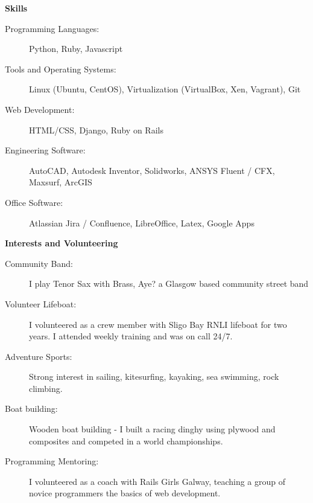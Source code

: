 \documentclass[letterpaper,11pt]{article}
\newcommand{\resheading}[1]{{\large \colorbox{mygrey}{\begin{minipage}{\textwidth}{\textbf{#1 \vphantom{p\^{E}}}}\end{minipage}}}}
\begin{document}
\resheading{Skills}
	\begin{description}
    \item[Programming Languages:] { \footnotesize Python, Ruby, Javascript}
    \item[Tools and Operating Systems:] { \footnotesize Linux (Ubuntu, CentOS), Virtualization (VirtualBox, Xen, Vagrant), Git
    }
    \item[Web Development:] {\footnotesize HTML/CSS, Django, Ruby on Rails }
    \item[Engineering Software:]{\footnotesize AutoCAD, Autodesk Inventor, Solidworks, ANSYS Fluent / CFX, Maxsurf, ArcGIS}
    \item[Office Software:]{\footnotesize Atlassian Jira / Confluence, LibreOffice, Latex, Google Apps} 
	\end{description} %

\resheading{Interests and Volunteering}
	\begin{description}
		\item[Community Band:] I play Tenor Sax with Brass, Aye? a Glasgow based community street band
		\item[Volunteer Lifeboat:] I volunteered as a crew member with Sligo Bay RNLI lifeboat for two years. I attended weekly training and was on call 24/7.
		\item[Adventure Sports:] Strong interest in sailing, kitesurfing, kayaking, sea swimming, rock climbing.
		\item[Boat building:] Wooden boat building - I built a racing dinghy using plywood and composites and competed in a world championships.
		\item[Programming Mentoring:] I volunteered as a coach with Rails Girls Galway, teaching a group of novice programmers the basics of web development.

	\end{description} %
\end{document}
